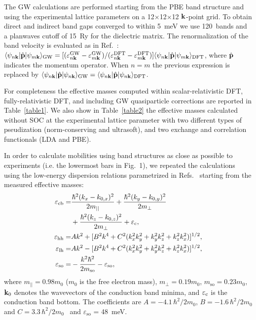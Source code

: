 \documentclass[aps,prl,twocolumn,superscriptaddress]{revtex4-1}
\begin{document}
The GW calculations are performed starting from the PBE band structure and using the experimental
lattice parameters on a 12$\times$12$\times$12 ${\bf k}$-point grid. To obtain direct and indirect band gaps converged to within 5~meV
we use 120~bands and a planwaves cutoff of 15~Ry for the dielectric matrix. The renormalization
of the band velocity is evaluated as in Ref.~\cite{Rohlfing2000}: 
$\langle \psi_{n{\bf k}} | {\hat{\bf p}} | \psi_{m{\bf k}}\rangle_{\rm GW} = 
[({\varepsilon}_{n{\bf k}}^{\rm GW}-{\varepsilon}_{m{\bf k}}^{\rm GW})/({\varepsilon}_{n{\bf k}}^{\rm DFT}-{\varepsilon}_{m{\bf k}}^{\rm DFT})]
\langle \psi_{n{\bf k}} | {\hat{\bf p}} | \psi_{m{\bf k}}\rangle_{\rm DFT}$, where ${\hat{\bf p}}$ indicates the momentum operator.
When $n=m$ the previous expression is replaced by 
$\langle \psi_{n{\bf k}} | {\hat{\bf p}} | \psi_{n{\bf k}}\rangle_{\rm GW} = \langle \psi_{n{\bf k}} | {\hat{\bf p}} | \psi_{n{\bf k}}\rangle_{\rm DFT}$.


For completeness the effective masses computed within scalar-relativistic DFT, fully-relativistic DFT,
and including GW quasiparticle corrections are reported in Table~\ref{table1}. 
We also show in Table~\ref{table2} the effective masses calculated without SOC at the experimental lattice parameter with 
two different types of pseudization (norm-conserving and ultrasoft), and two exchange and correlation 
functionals (LDA and PBE). 


In order to calculate mobilities using band structures as close as possible to experiments
(i.e. the lowermost bars in Fig.~1),
we repeated the calculations using the low-energy dispersion relations parametrized 
in Refs.~ starting from the measured effective masses:
\begin{align}
\varepsilon_{\text{cb}} =& \frac{\hbar^{2}(k_x-k_{0,x})^2}{2m_{||}}+ \frac{\hbar^{2}(k_y-k_{0,y})^2}{2m_{\perp}} \nonumber\\
                        &  + \frac{\hbar^{2}(k_z-k_{0,z})^2}{2m_{\perp}} + \varepsilon_{\rm c}, \\
\varepsilon_{\text{hh}} =& Ak^2 + [B^2k^4 + C^2(k_x^2k_y^2 + k_y^2k_z^2 + k_z^2k_x^2)]^{1/2},\\
\varepsilon_{\text{lh}} =& Ak^2 - [B^2k^4 + C^2(k_x^2k_y^2 + k_y^2k_z^2 + k_z^2k_x^2)]^{1/2},\\
\varepsilon_{\text{so}} =& -\frac{k^2\hbar^2}{2m_{\text{so}}} - \varepsilon_{\text{so}},
\end{align}
where $m_{||}=0.98m_0$ ($m_0$ is the free electron mass), 
$m_{\perp}=0.19m_0$, $m_{\text{so}}=0.23m_0$,  ${\bf k}_0$ denotes the wavevectors of 
the conduction band minima, and $\varepsilon_{\rm c}$ is the conduction band bottom. 
The coefficients are $A=-4.1\,\hbar^2/2m_0$, $B=-1.6\,\hbar^2/2m_0$ 
and $C=3.3\,\hbar^2/2m_0$~\cite{Dresselhaus1955,Yu2010} and 
$\varepsilon_{\text{so}}$ = 48~meV.
\end{document}
